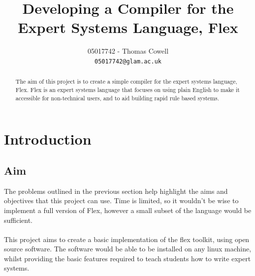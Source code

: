\documentclass[12pt]{report}
\begin{document}
\title{Developing a Compiler for the Expert Systems Language, Flex}
\author{05017742 - Thomas Cowell\\
		\texttt{05017742@glam.ac.uk}}

\maketitle

\begin{abstract}
The aim of this project is to create a simple compiler for the expert systems language, Flex.  Flex is an expert systems language that focuses on using plain English to make it accessible for non-technical users, and to aid building rapid rule based systems.
\end{abstract}

\pagestyle{plain}

\tableofcontents

\cleardoublepage
{}

\chapter{Introduction}
\section{Aim}\label{sec:aim}
The problems outlined in the previous section help highlight the aims and objectives that this project can use.  Time is limited, so it wouldn't be wise to implement a full version of Flex, however a small subset of the language would be sufficient.
\\
\\
This project aims to create a basic implementation of the flex toolkit, using open source software.  The software would be able to be installed on any linux machine, whilst providing the basic features required to teach students how to write expert systems.
\end{document}
